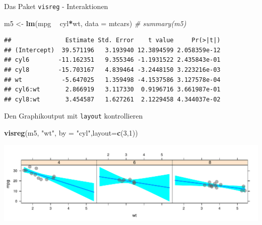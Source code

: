 \documentclass[ignorenonframetext,]{beamer}
\newenvironment{Shaded}{\begin{snugshade}}{\end{snugshade}}
\newcommand{\CommentTok}[1]{\textcolor[rgb]{0.56,0.35,0.01}{\textit{#1}}}
\newcommand{\DataTypeTok}[1]{\textcolor[rgb]{0.13,0.29,0.53}{#1}}
\newcommand{\DecValTok}[1]{\textcolor[rgb]{0.00,0.00,0.81}{#1}}
\newcommand{\KeywordTok}[1]{\textcolor[rgb]{0.13,0.29,0.53}{\textbf{#1}}}
\newcommand{\NormalTok}[1]{#1}
\newcommand{\OperatorTok}[1]{\textcolor[rgb]{0.81,0.36,0.00}{\textbf{#1}}}
\newcommand{\StringTok}[1]{\textcolor[rgb]{0.31,0.60,0.02}{#1}}
\begin{document}
\begin{frame}[fragile]{Das Paket \texttt{visreg} - Interaktionen}
\protect\hypertarget{das-paket-visreg---interaktionen}{}

\begin{Shaded}
\begin{Highlighting}[]
\NormalTok{m5 <-}\StringTok{ }\KeywordTok{lm}\NormalTok{(mpg }\OperatorTok{~}\StringTok{ }\NormalTok{cyl}\OperatorTok{*}\NormalTok{wt, }\DataTypeTok{data =}\NormalTok{ mtcars)}
\CommentTok{# summary(m5)}
\end{Highlighting}
\end{Shaded}

\begin{verbatim}
##               Estimate Std. Error    t value     Pr(>|t|)
## (Intercept)  39.571196   3.193940 12.3894599 2.058359e-12
## cyl6        -11.162351   9.355346 -1.1931522 2.435843e-01
## cyl8        -15.703167   4.839464 -3.2448150 3.223216e-03
## wt           -5.647025   1.359498 -4.1537586 3.127578e-04
## cyl6:wt       2.866919   3.117330  0.9196716 3.661987e-01
## cyl8:wt       3.454587   1.627261  2.1229458 4.344037e-02
\end{verbatim}

\end{frame}

\begin{frame}[fragile]{Den Graphikoutput mit \texttt{layout}
kontrollieren}
\protect\hypertarget{den-graphikoutput-mit-layout-kontrollieren}{}

\begin{Shaded}
\begin{Highlighting}[]
\KeywordTok{visreg}\NormalTok{(m5, }\StringTok{"wt"}\NormalTok{, }\DataTypeTok{by =} \StringTok{"cyl"}\NormalTok{,}\DataTypeTok{layout=}\KeywordTok{c}\NormalTok{(}\DecValTok{3}\NormalTok{,}\DecValTok{1}\NormalTok{))}
\end{Highlighting}
\end{Shaded}

\includegraphics{B3_linreg_files/figure-beamer/unnamed-chunk-40-1.pdf}

\end{frame}
\end{document}
